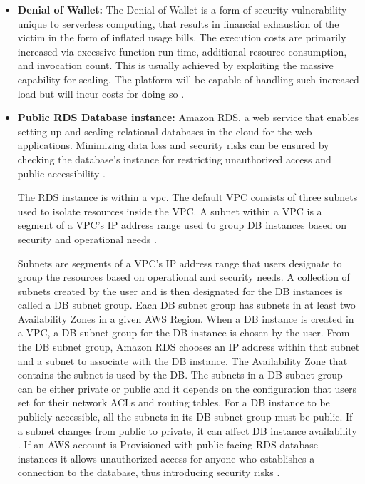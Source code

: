 \begin{itemize}
    \item \textbf{Denial of Wallet:} The Denial of Wallet is a form of security vulnerability unique to serverless
    computing,
    that results in financial exhaustion of the victim in the form of inflated usage bills.
    The execution costs are
    primarily increased via excessive function run time, additional resource consumption, and invocation count.
    This
    is usually achieved by exploiting the massive capability for scaling.
    The platform will be capable of handling
    such increased load but will incur costs for doing so
    \cite{63} \cite{64} \cite{65}.
\end{itemize}

\begin{itemize}
    \item \textbf{Public RDS Database instance:} Amazon RDS, a web service that enables setting up and scaling
    relational databases in the cloud for the web applications.
    Minimizing data loss and security risks can be
    ensured by checking the database’s instance for
    restricting unauthorized access and public
    accessibility \cite{66}.

    The RDS instance is within a \gls{vpc}.
    The default VPC consists of three subnets used to 
    isolate resources inside the VPC. A subnet within a 
    VPC is a segment of a VPC's IP address range used to 
    group DB instances based on security and operational 
    needs \cite{67}.

    Subnets are segments of a VPC's IP address range that users designate to group the resources based on operational and security needs.
    A collection of subnets created by the user and is then designated for the DB instances is called a DB subnet group.
    Each DB subnet group has subnets in at least two Availability Zones in a given AWS Region.
    When a DB instance is created in a VPC, a DB subnet group for the DB instance is chosen by the user.
    From the DB subnet group, Amazon RDS chooses an IP address within that subnet and a subnet to associate with the DB instance.
    The Availability Zone that contains the subnet is
    used by the DB. The subnets in a DB subnet group can
    be either private or public and it depends on the
    configuration that users set for their network ACLs
    and routing tables. For a DB instance to be publicly accessible, all the subnets in its DB subnet group must be public. If a subnet changes from public to private, it can affect DB instance availability \cite{67}. If an AWS account is Provisioned with public-facing RDS database instances it allows unauthorized access for anyone who establishes a connection to the database, thus introducing security risks \cite{68}.
\end{itemize}

